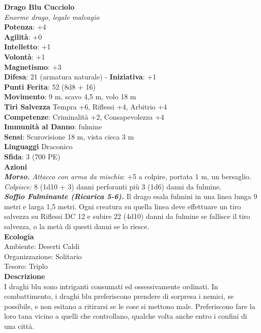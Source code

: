 \begin{multicols}{2}
\medskip\textbf{Drago Blu Cucciolo}\\
\emph{Enorme drago, legale malvagio}\\
\textbf{Potenza}: +4\\
\textbf{Agilità}: +0\\
\textbf{Intelletto}: +1\\
\textbf{Volontà}: +1\\
\textbf{Magnetismo}: +3\\
\textbf{Difesa}: 21 (armatura naturale) - \textbf{Iniziativa}: +1\\
\textbf{Punti Ferita}: 52 (8d8 + 16)\\
\textbf{Movimento}: 9 m, scavo 4,5 m, volo 18 m\\
\textbf{Tiri Salvezza} Tempra +6, Riflessi +4, Arbitrio +4\\
\textbf{Competenze}: Criminalità +2, Consapevolezza +4\\
\textbf{Immunità al Danno}: fulmine\\
\textbf{Sensi}: Scurovisione 18 m, vista cieca 3 m\\
\textbf{Linguaggi} Draconico\\
\textbf{Sfida}: 3 (700 PE)\smallskip\\
\smallskip\textbf{Azioni}\\
\emph{\textbf{Morso.} Attacco con arma da mischia}: +5 a colpire, portata 1 m, un bersaglio.\\
\emph{Colpisce:} 8 (1d10 + 3) danni perforanti più 3 (1d6) danni da fulmine.\\
\emph{\textbf{Soffio Fulminante (Ricarica 5-6).}} Il drago esala fulmini in una linea lunga 9 metri e larga 1,5 metri. Ogni creatura su quella linea deve effettuare un tiro salvezza su Riflessi DC 12 e subire 22 (4d10) danni da fulmine se fallisce il tiro salvezza, o la metà di questi danni se lo riesce.\\
\textbf{Ecologia}\\
Ambiente: Deserti Caldi\\
Organizzazione: Solitario\\
Tesoro: Triplo\\
\textbf{Descrizione}\\
I draghi blu sono intriganti consumati ed ossessivamente ordinati. In combattimento, i draghi blu preferiscono prendere di sorpresa i nemici, se possibile, e non esitano a ritirarsi se le cose si mettono male. Preferiscono fare la loro tana vicino a quelli che controllano, qualche volta anche entro i confini di una città.\\



\end{multicols}
